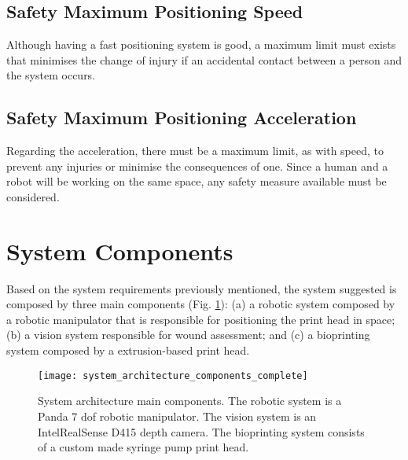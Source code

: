 
\subsection{Safety Maximum Positioning Speed}
\label{subsec:system_architecture_requirements_safety_max_positioning_speed}

Although having a fast positioning system is good, a maximum limit must exists that minimises the change of injury if an accidental contact between a person and the system occurs.


\subsection{Safety Maximum Positioning Acceleration}
\label{subsec:system_architecture_requirements_safety_max_positioning_acceleration}

Regarding the acceleration, there must be a maximum limit, as with speed, to prevent any injuries or minimise the consequences of one. Since a human and a robot will be working on the same space, any safety measure available must be considered.




\section{System Components}
\label{sec:system_architecture_components}

Based on the system requirements previously mentioned, the system suggested is composed by three main components (Fig. \ref{fig:system_architecture_components}): (a) a robotic system composed by a robotic manipulator that is responsible for positioning the print head in space; (b) a vision system responsible for wound assessment; and (c) a bioprinting system composed by a extrusion-based print head.

\begin{figure}[htbp]
	\centering
	\texttt{[image: system\_architecture\_components\_complete]}
	\caption{System architecture main components. The robotic system is a Panda 7 \gls{dof} robotic manipulator. The vision system is an Intel\textregistered RealSense\texttrademark{} D415 depth camera. The bioprinting system consists of a custom made syringe pump print head.}
	\label{fig:system_architecture_components}
\end{figure}

